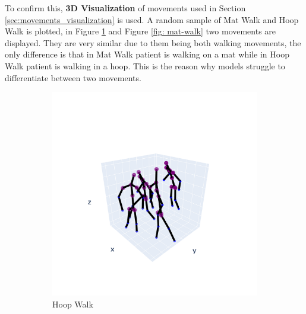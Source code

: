             \newpage

            To confirm this, \textbf{3D Visualization} of movements used in Section \ref{sec:movements_visualization} is used. A random sample of Mat Walk and Hoop Walk is plotted, in Figure \ref{fig: hoop-walk} and Figure \ref{fig: mat-walk} two movements are displayed. They are very similar due to them being both walking movements, the only difference is that in Mat Walk patient is walking on a mat while in Hoop Walk patient is walking in a hoop. This is the reason why models struggle to differentiate between two movements.

            \begin{figure}[h]
                \begin{subfigure}{.5\textwidth}
                \centering
                  \includegraphics[width=1.\linewidth]{../src/resources/plots/movements/mov-1.png}
                  \caption{Hoop Walk}
                  \label{fig: hoop-walk}
                \end{subfigure}
                \begin{subfigure}{.5\textwidth}
                \centering

\end{subfigure}
\end{figure}

